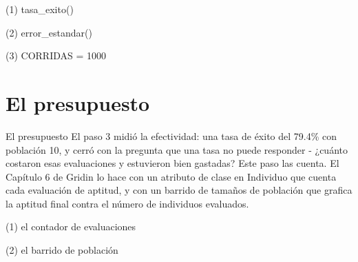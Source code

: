 \begin{frame}[fragile]{(1) tasa\_exito()}

\end{frame}

\begin{frame}[fragile]{(2) error\_estandar()}

\end{frame}

\begin{frame}[fragile]{(3) CORRIDAS = 1000}

\end{frame}


\section{El presupuesto}

\begin{frame}{El presupuesto}
El paso 3 midió la efectividad: una tasa de éxito del 79.4\% con población 10, y
cerró con la pregunta que una tasa no puede responder - ¿cuánto costaron esas evaluaciones
y estuvieron bien gastadas? Este paso las cuenta. El Capítulo 6 de Gridin
lo hace con un atributo de clase en Individuo que cuenta cada evaluación de
aptitud, y con un barrido de tamaños de población que grafica la aptitud final
contra el número de individuos evaluados.
\end{frame}

\begin{frame}[fragile]{(1) el contador de evaluaciones}

\end{frame}

\begin{frame}[fragile]{(2) el barrido de población}

\end{frame}

